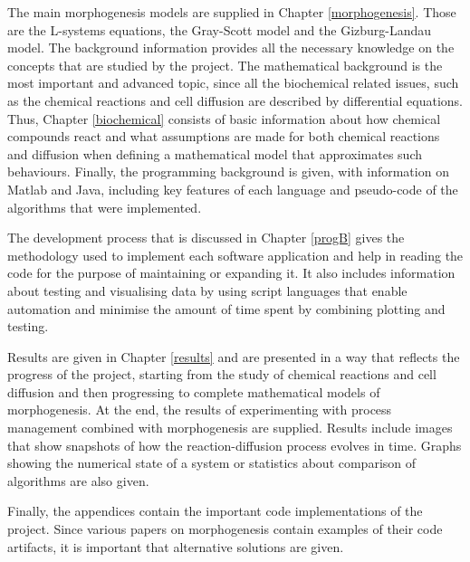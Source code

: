 The main morphogenesis models are supplied in Chapter \ref{morphogenesis}. Those are the L-systems equations, the Gray-Scott model and the Gizburg-Landau model. The background information provides all the necessary knowledge on the concepts that are studied by the project. The mathematical background is the most important and advanced topic, since all the biochemical related issues, such as the chemical reactions and cell diffusion are described by differential equations. Thus, Chapter \ref{biochemical} consists of basic information about how chemical compounds react and what assumptions are made for both chemical reactions and diffusion when defining a mathematical model that approximates such behaviours. Finally, the programming background is given, with information on Matlab and Java, including key features of each language and pseudo-code of the algorithms that were implemented.

The development process that is discussed in Chapter \ref{progB} gives the methodology used to implement each software application and help in reading the code for the purpose of maintaining or expanding it. It also includes information about testing and visualising data by using script languages that enable automation and minimise the amount of time spent by combining plotting and testing.

Results are given in Chapter \ref{results} and are presented in a way that reflects the progress of the project, starting from the study of chemical reactions and cell diffusion and then progressing to complete mathematical models of morphogenesis. At the end, the results of experimenting with process management combined with morphogenesis are supplied. Results include images that show snapshots of how the reaction-diffusion process evolves in time. Graphs showing the numerical state of a system or statistics about comparison of algorithms are also given.   

Finally, the appendices contain the important code implementations of the project. Since various papers on morphogenesis \cite{heineike_modeling_2002}\cite{kassam_solving_2003} contain examples of their code artifacts, it is important that alternative solutions are given. 
